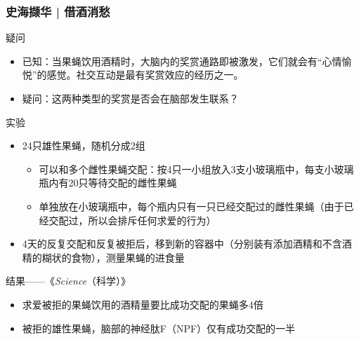 \begin{frame}
  \frametitle{史海撷华 | 借酒消愁}
  \vspace{-0.5em}
  \begin{block}{疑问}
    \begin{itemize}
      \item 已知：当果蝇饮用酒精时，大脑内的奖赏通路即被激发，它们就会有“心情愉悦”的感觉。社交互动是最有奖赏效应的经历之一。
      \item 疑问：这两种类型的奖赏是否会在脑部发生联系？
  \vspace{-0.5em}
    \end{itemize}
  \end{block}
  \vspace{-0.5em}
  \pause
  \begin{block}{实验}
    \begin{itemize}
      \item 24只雄性果蝇，随机分成2组
        \begin{itemize}
          \item 可以和多个雌性果蝇交配：按4只一小组放入3支小玻璃瓶中，每支小玻璃瓶内有20只等待交配的雌性果蝇
          \item 单独放在小玻璃瓶中，每个瓶内只有一只已经交配过的雌性果蝇（由于已经交配过，所以会排斥任何求爱的行为）
        \end{itemize}
  \vspace{-0.5em}
      \item 4天的反复交配和反复被拒后，移到新的容器中（分别装有添加酒精和不含酒精的糊状的食物），测量果蝇的进食量
  \vspace{-0.5em}
    \end{itemize}
  \end{block}
  \vspace{-0.5em}
  \pause
  \begin{block}{结果——《\textit{Science}（科学）》}
    \begin{itemize}
      \item 求爱被拒的果蝇饮用的酒精量要比成功交配的果蝇多4倍
      \item 被拒的雄性果蝇，脑部的神经肽F（NPF）仅有成功交配的一半
  \vspace{-0.7em}
    \end{itemize}
  \end{block}
\end{frame}

